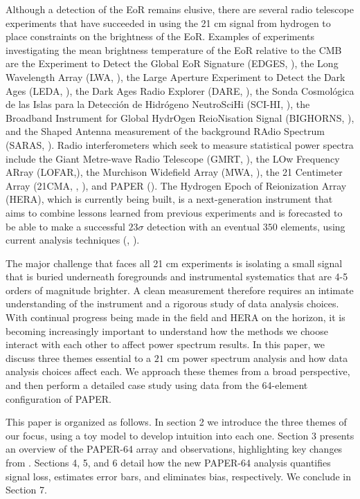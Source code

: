\documentclass[preprint2,numberedappendix,tighten,twocolappendix]{aastex6}  %
\begin{document}
Although a detection of the EoR remains elusive, there are several radio telescope experiments that have succeeded in using the 21 cm signal from hydrogen to place constraints on the brightness of the EoR. Examples of experiments investigating the mean brightness temperature of the EoR relative to the CMB are the Experiment to Detect the Global EoR Signature (EDGES, \citealt{bowman2010}), the Long Wavelength Array (LWA, \citealt{ellingson_et_al2009}),  the Large Aperture Experiment to Detect the Dark Ages (LEDA, \citealt{greenhill_bernardi2012}), the Dark Ages Radio Explorer (DARE, \citealt{burns2012}), the Sonda Cosmol\'ogica de las Islas para la Detecci\'on de Hidr\'ogeno NeutroSciHi (SCI-HI, \citealt{voytek2014}), the Broadband Instrument for Global HydrOgen ReioNisation Signal (BIGHORNS, \citealt{sokolowski2015}), and the Shaped Antenna measurement of the background RAdio Spectrum (SARAS, \citealt{patra2015}). Radio interferometers which seek to measure statistical power spectra include the Giant Metre-wave Radio Telescope (GMRT, \citealt{paciga_et_al2013}), the LOw Frequency ARray (LOFAR,\citealt{van_haarlem_et_al2013}), the Murchison Widefield Array (MWA, \citealt{tingay_et_al2013}), the 21 Centimeter Array (21CMA, \citealt{peterson_et_al2004}, \citealt{wu2009}), and PAPER (\citealt{parsons_et_al2010}). The Hydrogen Epoch of Reionization Array (HERA), which is currently being built, is a next-generation instrument that aims to combine lessons learned from previous experiments and is forecasted to be able to make a successful $23\sigma$ detection with an eventual $350$ elements, using current analysis techniques (\citealt{deboer_et_al2017}, \citealt{pober_et_al2014}).

The major challenge that faces all 21 cm experiments is isolating a small signal that is buried underneath foregrounds and instrumental systematics that are 4-5 orders of magnitude brighter. A clean measurement therefore requires an intimate understanding of the instrument and a rigorous study of data analysis choices. With continual progress being made in the field and HERA on the horizon, it is becoming increasingly important to understand how the methods we choose interact with each other to affect power spectrum results. In this paper, we discuss three themes essential to a $21$ cm power spectrum analysis and how data analysis choices affect each. We approach these themes from a broad perspective, and then perform a detailed case study using data from the 64-element configuration of PAPER.

This paper is organized as follows. In section 2 we introduce the three themes of our focus, using a toy model to develop intuition into each one. Section 3 presents an overview of the PAPER-64 array and observations, highlighting key changes from \citet{ali_et_al2015}. Sections 4, 5, and 6 detail how the new PAPER-64 analysis quantifies signal loss, estimates error bars, and eliminates bias, respectively. We conclude in Section 7.
\end{document}
